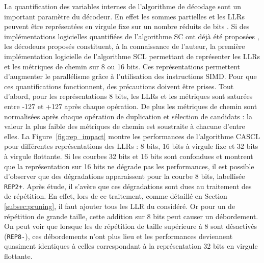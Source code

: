 La quantification des variables internes de l'algorithme de décodage sont un important paramètre du décodeur. En effet les sommes partielles et les LLRs peuvent être représentées en virgule fixe sur un nombre réduits de bits \cite{balatsoukas-stimming_llr-based_2015}. Si des implémentations logicielles quantifiées de l'algorithme SC ont déjà été proposées \cite{giard_low-latency_2016}, les décodeurs proposés constituent, à la connaissance de l'auteur, la première implémentation logicielle de l'algorithme SCL permettant de représenter les LLRs et les métriques de chemin sur 8 ou 16 bits. Ces représentations permettent d'augmenter le parallélisme grâce à l'utilisation des instructions SIMD. Pour que ces quantifications fonctionnent, des précautions doivent être prises. Tout d'abord, pour les représentations 8 bits, les LLRs et les métriques sont saturées entre -127 et +127 après chaque opération. De plus les métriques de chemin sont normalisées après chaque opération de duplication et sélection de candidats : la valeur la plus faible des métriques de chemin est soustraite à chacune d'entre elles. La Figure~\ref{fig:rep_impact} montre les performances de l'algorithme CASCL pour différentes représentations des LLRs : 8 bits, 16 bits à virgule fixe et 32 bits à virgule flottante. Si les courbes 32 bits et 16 bits sont confondues et montrent que la représentation sur 16 bits ne dégrade pas les performances, il est possible d'observer que des dégradations apparaissent pour la courbe 8 bits, labellisée \texttt{REP2+}. Après étude, il s'avère que ces dégradations sont dues au traitement des \noeuds de répétition. En effet, lors de ce traitement, comme détaillé en Section \ref{subsec:pruning}, il faut ajouter tous les LLR du \noeud considéré. Or pour un \noeud de répétition de grande taille, cette addition sur 8 bits peut causer un débordement. On peut voir que lorsque les \noeuds de répétition de taille supérieure à 8 sont désactivés (\texttt{REP8-}), ces débordements n'ont plus lieu et les performances deviennent quasiment identiques à celles correspondant à la représentation 32 bits en virgule flottante.

